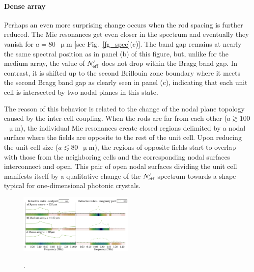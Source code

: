 \paragraph{Dense array}%
Perhaps an even more surprising change occurs when the rod spacing is further reduced. The Mie resonances get even closer in the spectrum and eventually they vanish for $a=80$~$\upmu$m [see Fig.~\ref{fg_spec}(c)]. The band gap remains at nearly the same spectral position as in panel (b) of this figure, but, unlike for the medium array, the value of $N_{\text{eff} }'$ does not drop within the Bragg band gap. In contrast, it is shifted up to the second Brillouin zone boundary where it meets the second Bragg band gap as clearly seen in panel (c), indicating that each unit cell is intersected by two nodal planes in this state.

The reason of this behavior is related to the change of the nodal plane topology caused by the inter-cell coupling. When the rods are far from each other ($a\gtrsim 100$~$\upmu$m), the individual Mie resonances create closed regions delimited by a nodal surface where the fields are opposite to the rest of the unit cell. Upon reducing the unit-cell size ($a\lesssim 80$~$\upmu$m), the regions of opposite fields start to overlap with those from the neighboring cells and the corresponding nodal surfaces interconnect and open. This pair of open nodal surfaces dividing the unit cell manifests itself by a qualitative change of the $N_{\text{eff} }'$ spectrum towards a shape typical for one-dimensional photonic crystals.

\begin{figure}\centering 
\includegraphics[width=0.5\textwidth]{img/ERods_sketch_of_separate_spectra_to_continuous_scan.pdf}
\caption{} \label{fg_spacingscan100formation}. 
\end{figure}



